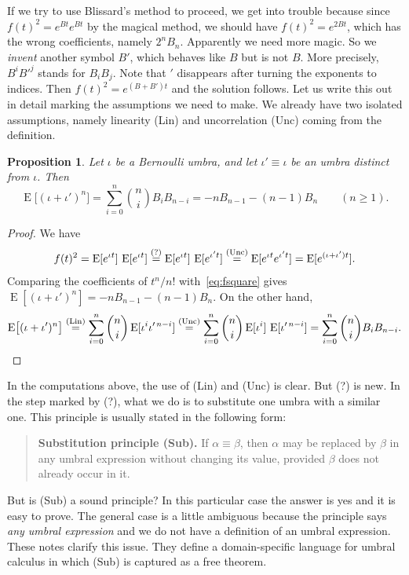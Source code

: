 \documentclass[11pt,a4paper]{report}
\theoremstyle{plain}
\newtheorem{proposition}[theorem]{Proposition}
\theoremstyle{definition}
\theoremstyle{remark}
\newcommand{\E}{\operatorname{E}}
\newcommand{\by}[1]{\mathrel{\overset{\textup{(#1)}}{=}}}
\begin{document}
If we try to use Blissard's method to proceed, we get into trouble because since $f(t)^2 = e^{Bt}e^{Bt}$
by the magical method, we should have $f(t)^2 = e^{2Bt}$, which has the wrong coefficients,
namely $2^n B_n$. Apparently we need more magic. So we \emph{invent} another symbol $B'$, which behaves 
like $B$ but is not $B$. More precisely, $B^i B'^j$ stands for $B_i B_j$. Note that $'$ disappears 
after turning the exponents to indices. Then $f(t)^2 = e^{(B+B')t}$ and the solution follows. Let us 
write this out in detail marking the assumptions we need to make. We already have two
isolated assumptions, namely linearity (Lin) and uncorrelation (Unc) coming from the definition. 

\begin{proposition}
\label{prop:euler}
Let $\iota$ be a Bernoulli umbra, and let $\iota' \equiv \iota$ be an umbra
distinct from $\iota$. Then
\[
  \E\bigl[(\iota+\iota')^n\bigr]
    = \sum_{i=0}^{n} \binom{n}{i} B_i B_{n-i}
    = -n B_{n-1} - (n-1) B_n
  \qquad (n \geq 1) .
\]
\end{proposition}

\begin{proof}
We have
\[
  f(t)^2
    = \E[e^{\iota t}]\,\E[e^{\iota t}]
    \by{?} \E[e^{\iota t}]\,\E[e^{\iota' t}]
    \by{Unc} \E[e^{\iota t} e^{\iota' t}]
    = \E[e^{(\iota+\iota')t}] .
\]
Comparing the coefficients of $t^n/n!$ with~\eqref{eq:fsquare} gives
$\E[(\iota+\iota')^n] = -n B_{n-1} - (n-1) B_n$. On the other hand,
\[
  \E\bigl[(\iota+\iota')^n\bigr]
    \by{Lin} \sum_{i=0}^{n} \binom{n}{i} \E[\iota^i \iota'^{\,n-i}]
    \by{Unc} \sum_{i=0}^{n} \binom{n}{i} \E[\iota^i]\,\E[\iota'^{\,n-i}]
    = \sum_{i=0}^{n} \binom{n}{i} B_i B_{n-i} .
\]
\end{proof}

In the computations above, the use of (Lin) and (Unc) is clear. But (?) is new. 
In the step marked by (?), what we do is to substitute one umbra with a similar one.
This principle is usually stated in the following form: 

\begin{quote}
\textbf{Substitution principle (Sub).} If $\alpha \equiv \beta$, then $\alpha$ may be
replaced by $\beta$ in any umbral expression without changing its value,
provided $\beta$ does not already occur in it.
\end{quote}

But is (Sub) a sound principle? In this particular case the answer is yes and it is
easy to prove. The general case is a little ambiguous because the principle says \emph{any umbral expression}
and we do not have a definition of an umbral expression. These notes clarify this issue.
They define a domain-specific language for umbral calculus in which (Sub) is
captured as a free theorem.
\end{document}
